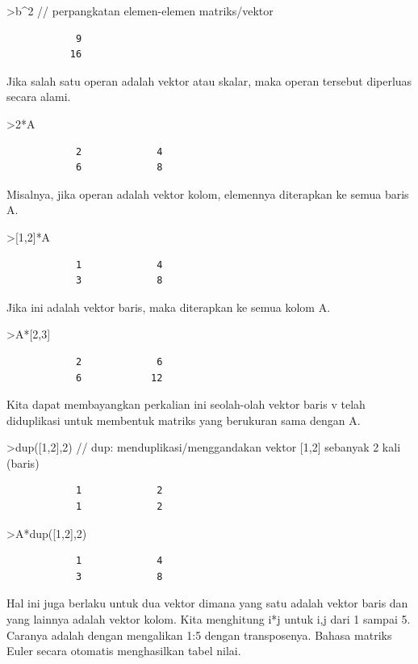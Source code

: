 \documentclass[
]{book}
\begin{document}
\textgreater b\^{}2 // perpangkatan elemen-elemen matriks/vektor

\begin{verbatim}
            9 
           16 
\end{verbatim}

Jika salah satu operan adalah vektor atau skalar, maka operan tersebut diperluas secara alami.

\textgreater2*A

\begin{verbatim}
            2             4 
            6             8 
\end{verbatim}

Misalnya, jika operan adalah vektor kolom, elemennya diterapkan ke semua baris A.

\textgreater{[}1,2{]}*A

\begin{verbatim}
            1             4 
            3             8 
\end{verbatim}

Jika ini adalah vektor baris, maka diterapkan ke semua kolom A.

\textgreater A*{[}2,3{]}

\begin{verbatim}
            2             6 
            6            12 
\end{verbatim}

Kita dapat membayangkan perkalian ini seolah-olah vektor baris v telah diduplikasi untuk membentuk matriks yang berukuran sama dengan A.

\textgreater dup({[}1,2{]},2) // dup: menduplikasi/menggandakan vektor {[}1,2{]} sebanyak 2 kali (baris)

\begin{verbatim}
            1             2 
            1             2 
\end{verbatim}

\textgreater A*dup({[}1,2{]},2)

\begin{verbatim}
            1             4 
            3             8 
\end{verbatim}

Hal ini juga berlaku untuk dua vektor dimana yang satu adalah vektor baris dan yang lainnya adalah vektor kolom. Kita menghitung i*j untuk i,j dari 1 sampai 5. Caranya adalah dengan mengalikan 1:5 dengan transposenya. Bahasa matriks Euler secara otomatis menghasilkan tabel nilai.
\end{document}
